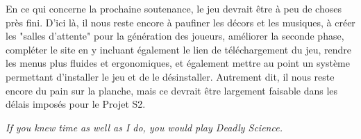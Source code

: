 \documentclass{article}
\begin{document}
En ce qui concerne la prochaine soutenance, le jeu devrait être à peu de choses près fini. D'ici là, il nous reste encore à paufiner les décors et les musiques, à créer les "salles d'attente" pour la génération des joueurs, améliorer la seconde phase, compléter le site en y incluant également le lien de téléchargement du jeu, rendre les menus plus fluides et ergonomiques, et également mettre au point un système permettant d'installer le jeu et de le désinstaller. Autrement dit, il nous reste encore du pain sur la planche, mais ce devrait être largement faisable dans les délais imposés pour le Projet S2.

\emph{If you knew time as well as I do, you would play Deadly Science.}

\end{document}
